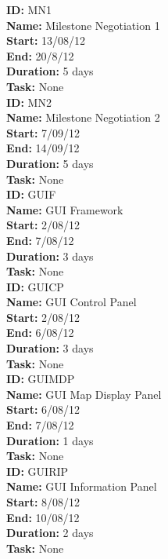 \documentclass[11pt, a4paper]{report}
\begin{document}
\noindent \textbf{ID:} MN1 \\
\noindent \textbf{Name:} Milestone Negotiation 1 \\
\noindent \textbf{Start:} 13/08/12 \\
\noindent \textbf{End:} 20/8/12 \\
\noindent \textbf{Duration:} 5 days \\
\noindent \textbf{Task:} None\\[0.5cm]

\noindent \textbf{ID:} MN2 \\
\noindent \textbf{Name:} Milestone Negotiation 2 \\
\noindent \textbf{Start:} 7/09/12 \\
\noindent \textbf{End:} 14/09/12 \\
\noindent \textbf{Duration:} 5 days \\
\noindent \textbf{Task:} None\\[0.5cm]

\noindent \textbf{ID:} GUIF \\
\noindent \textbf{Name:} GUI Framework \\
\noindent \textbf{Start:} 2/08/12 \\
\noindent \textbf{End:} 7/08/12 \\
\noindent \textbf{Duration:} 3 days \\
\noindent \textbf{Task:} None\\[0.5cm]

\noindent \textbf{ID:} GUICP \\
\noindent \textbf{Name:} GUI Control Panel \\
\noindent \textbf{Start:} 2/08/12 \\
\noindent \textbf{End:} 6/08/12 \\
\noindent \textbf{Duration:} 3 days \\
\noindent \textbf{Task:} None\\[0.5cm]

\noindent \textbf{ID:} GUIMDP \\
\noindent \textbf{Name:} GUI Map Display Panel \\
\noindent \textbf{Start:} 6/08/12 \\
\noindent \textbf{End:} 7/08/12 \\
\noindent \textbf{Duration:} 1 days \\
\noindent \textbf{Task:} None\\[0.5cm]

\noindent \textbf{ID:} GUIRIP \\
\noindent \textbf{Name:} GUI Information Panel \\
\noindent \textbf{Start:} 8/08/12 \\
\noindent \textbf{End:} 10/08/12 \\
\noindent \textbf{Duration:} 2 days \\
\noindent \textbf{Task:} None\\[0.5cm]
\end{document}
